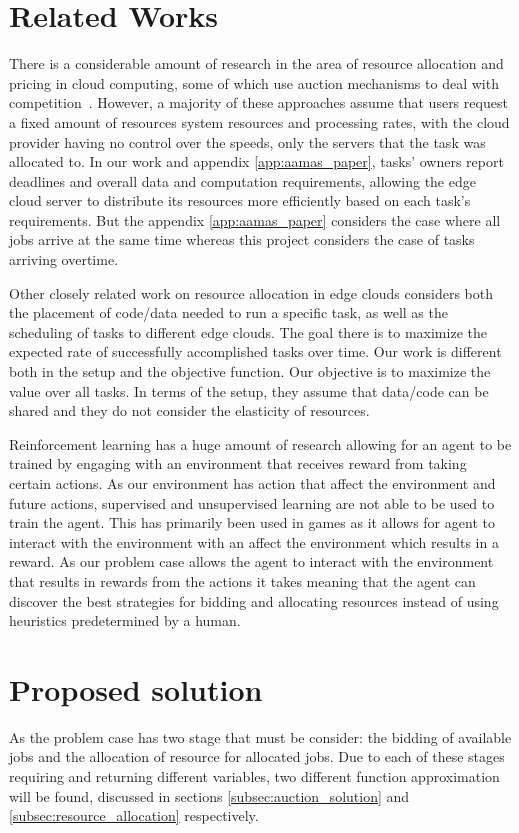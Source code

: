 \documentclass[sotoncolour]{extra/uosproject}     %
\begin{document}
\chapter{Related Works}
There is a considerable amount of research in the area of resource allocation and pricing in cloud computing, some of which use auction mechanisms to deal with competition~\cite{KUMAR2017234,Zhang2017,Du2019,Bi2019}. %
However, a majority of these approaches assume that users request a fixed amount of resources system resources and processing rates, with the cloud provider having no control over the speeds, only the servers that the task was allocated to.  In our work and appendix \ref{app:aamas_paper}, tasks' owners report deadlines and overall data and computation requirements, allowing the edge cloud server to distribute its resources more efficiently based on each task's requirements. But the appendix \ref{app:aamas_paper} considers the case where all jobs arrive at the same time whereas this project considers the case of tasks arriving overtime. 

Other closely related work on resource allocation in edge clouds \cite{vaji_infocom} considers both the placement of code/data needed to run a specific task, as well as the scheduling of tasks to different edge clouds. The goal there is to maximize the expected rate of successfully accomplished tasks over time. Our work is different both in the setup and the objective function. Our objective is to maximize the value over all tasks. In terms of the setup, they assume that data/code can be shared and they do not consider the elasticity of resources.

Reinforcement learning has a huge amount of research \cite{Sutton1998} allowing for an agent to be trained by engaging with an environment that receives reward from taking certain actions. As our environment has action that affect the environment and future actions, supervised and unsupervised learning are not able to be used to train the agent. This has primarily been used in games \cite{atari, silver2017mastering} as it allows for agent to interact with the environment with an affect the environment which results in a reward. As our problem case allows the agent to interact with the environment that results in rewards from the actions it takes meaning that the agent can discover the best strategies for bidding and allocating resources instead of using heuristics predetermined by a human. 

\chapter{Proposed solution}\label{sec:proposed_solution}
As the problem case has two stage that must be consider: the bidding of available jobs and the allocation of resource for allocated jobs. Due to each of these stages requiring and returning different variables, two different function approximation will be found, discussed in sections \ref{subsec:auction_solution} and \ref{subsec:resource_allocation} respectively.
\end{document}

